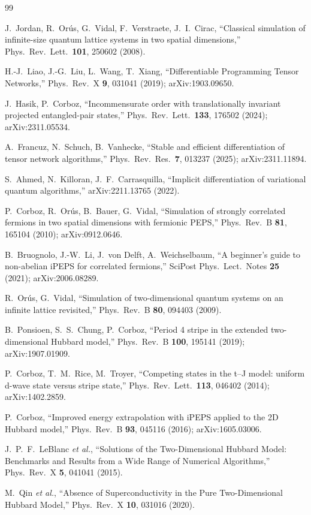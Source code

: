 \documentclass[aps,prb,reprint,amsmath,amssymb,floatfix]{revtex4-2}
\begin{document}
\begin{thebibliography}{99}

J.~Jordan, R.~Or{\'u}s, G.~Vidal, F.~Verstraete, J.~I.~Cirac,
``Classical simulation of infinite-size quantum lattice systems in two spatial dimensions,''
Phys.\ Rev.\ Lett.\ \textbf{101}, 250602 (2008).

H.-J.~Liao, J.-G.~Liu, L.~Wang, T.~Xiang,
``Differentiable Programming Tensor Networks,''
Phys.\ Rev.\ X \textbf{9}, 031041 (2019); arXiv:1903.09650.

J.~Hasik, P.~Corboz,
``Incommensurate order with translationally invariant projected entangled-pair states,''
Phys.\ Rev.\ Lett.\ \textbf{133}, 176502 (2024); arXiv:2311.05534.

A.~Francuz, N.~Schuch, B.~Vanhecke,
``Stable and efficient differentiation of tensor network algorithms,''
Phys.\ Rev.\ Res.\ \textbf{7}, 013237 (2025); arXiv:2311.11894.

S.~Ahmed, N.~Killoran, J.~F.~Carrasquilla,
``Implicit differentiation of variational quantum algorithms,''
arXiv:2211.13765 (2022).

P.~Corboz, R.~Or{\'u}s, B.~Bauer, G.~Vidal,
``Simulation of strongly correlated fermions in two spatial dimensions with fermionic PEPS,''
Phys.\ Rev.\ B \textbf{81}, 165104 (2010); arXiv:0912.0646.

B.~Bruognolo, J.-W.~Li, J.~von Delft, A.~Weichselbaum,
``A beginner's guide to non-abelian iPEPS for correlated fermions,''
SciPost Phys.\ Lect.\ Notes \textbf{25} (2021); arXiv:2006.08289.

R.~Or{\'u}s, G.~Vidal,
``Simulation of two-dimensional quantum systems on an infinite lattice revisited,''
Phys.\ Rev.\ B \textbf{80}, 094403 (2009).

B.~Ponsioen, S.~S.~Chung, P.~Corboz,
``Period 4 stripe in the extended two-dimensional Hubbard model,''
Phys.\ Rev.\ B \textbf{100}, 195141 (2019); arXiv:1907.01909.

P.~Corboz, T.~M.~Rice, M.~Troyer,
``Competing states in the t--J model: uniform d-wave state versus stripe state,''
Phys.\ Rev.\ Lett.\ \textbf{113}, 046402 (2014); arXiv:1402.2859.

P.~Corboz,
``Improved energy extrapolation with iPEPS applied to the 2D Hubbard model,''
Phys.\ Rev.\ B \textbf{93}, 045116 (2016); arXiv:1605.03006.

J.~P.~F.~LeBlanc \emph{et al.}, ``Solutions of the Two-Dimensional Hubbard Model: Benchmarks and Results from a Wide Range of Numerical Algorithms,''
Phys.\ Rev.\ X \textbf{5}, 041041 (2015).

M.~Qin \emph{et al.},
``Absence of Superconductivity in the Pure Two-Dimensional Hubbard Model,''
Phys.\ Rev.\ X \textbf{10}, 031016 (2020).

\end{thebibliography}
\end{document}
